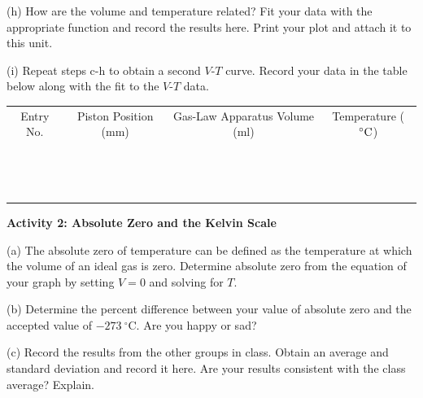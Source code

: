 (h) How are the volume and temperature related?
Fit your data with the appropriate function and record the results here.
Print your plot and attach it to this unit.
\vspace{15mm}

\pagebreak[2]
(i) Repeat steps c-h to obtain a second $V$-$T$ curve. Record your data in the table below
along with the fit to the $V$-$T$ data.

\vspace{0.3cm}
\begin{center}
{\renewcommand{\arraystretch}{1.1}
\begin{tabular}{|c|c|c|c|}
\hline 
Entry No.&
Piston Position (mm)&
Gas-Law Apparatus Volume (ml)&
Temperature ($^\circ  \rm C$)\\
\hhline{|=|=|=|=|}
& & & \\
\hline 
& & & \\
\hline 
& & & \\
\hline 
& & & \\
\hline 
& & & \\
\hline 
& & & \\
\hline 
& & & \\
\hline 
& & & \\
\hline 
& & & \\
\hline 
& & & \\
\hline 
& & & \\
\hline 
& & & \\
\hline 
& & & \\
\hline 
& & & \\
\hline 
\end{tabular}\par}
\end{center}
\answerspace{20mm}


\textbf{Activity 2: Absolute Zero and the Kelvin Scale}

(a) The absolute zero of temperature can be defined as the temperature
at which the volume of an ideal gas is zero. Determine absolute
zero from the equation of your graph by setting $V = 0$ and solving for $T$.
\answerspace{30mm}

(b) Determine the percent difference between your value of absolute
zero and the accepted value of $-273~^{\circ }$C. Are you happy or sad?
\answerspace{30mm}

(c) Record the results from the other groups in class.
Obtain an average and standard deviation and record it here.
Are your results consistent with the class average? Explain.
\answerspace{10mm}
